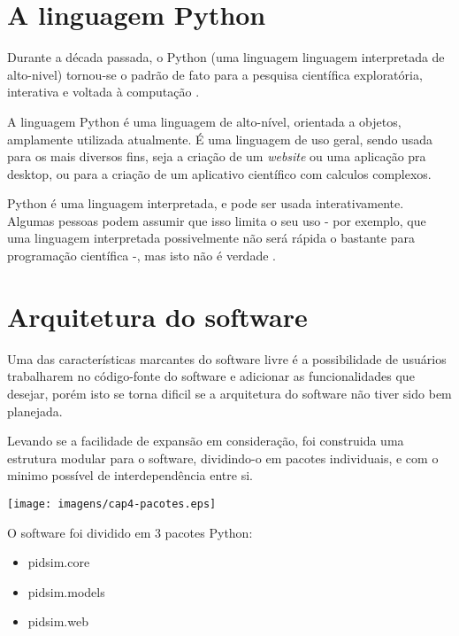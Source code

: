 \section{A linguagem Python}

    Durante a década passada, o Python \cite{Python} (uma linguagem linguagem interpretada
    de alto-nivel) tornou-se o padrão de fato para a pesquisa científica
    exploratória, interativa e voltada à computação \cite{5725235}.
    
    A linguagem Python é uma linguagem de alto-nível, orientada a objetos,
    amplamente utilizada atualmente. É uma linguagem de uso geral, sendo
    usada para os mais diversos fins, seja a criação de um \textit{website}
    ou uma aplicação pra desktop, ou para a criação de um aplicativo científico
    com calculos complexos.
    
    Python é uma linguagem interpretada, e pode ser usada interativamente.
    Algumas pessoas podem assumir que isso limita o seu uso - por exemplo,
    que uma linguagem interpretada possivelmente não será rápida o bastante
    para programação científica -, mas isto não é verdade \cite{4160249}.

\section{Arquitetura do software}

    Uma das características marcantes do software livre é a possibilidade de
    usuários trabalharem no código-fonte do software e adicionar as funcionalidades
    que desejar, porém isto se torna dificil se a arquitetura do software não tiver
    sido bem planejada.

    Levando se a facilidade de expansão em consideração, foi construida uma estrutura
    modular para o software, dividindo-o em pacotes individuais, e com o minimo
    possível de interdependência entre si.
    
    \begin{center}
        \texttt{[image: imagens/cap4-pacotes.eps]}
    \end{center}
    
    O software foi dividido em 3 pacotes Python:

    \begin{itemize}
        \item pidsim.core
        \item pidsim.models
        \item pidsim.web
    \end{itemize}

